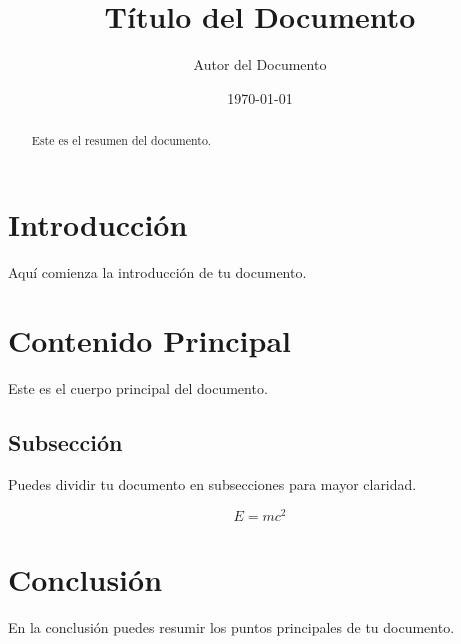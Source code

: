 \documentclass[a4paper,12pt]{article}
\title{Título del Documento}
\author{Autor del Documento}
\date{\today}
\begin{document}
\maketitle

\begin{abstract}
Este es el resumen del documento.
\end{abstract}

\section{Introducción}
Aquí comienza la introducción de tu documento.

\section{Contenido Principal}
Este es el cuerpo principal del documento.

\subsection{Subsección}
Puedes dividir tu documento en subsecciones para mayor claridad.

\begin{equation}
E = mc^2
\end{equation}

\section{Conclusión}
En la conclusión puedes resumir los puntos principales de tu documento.
\end{document}
